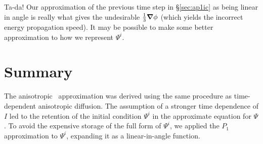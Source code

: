 Ta-da! Our approximation of the previous time step in \S\ref{sec:ap1ic} as
being linear in angle is really what gives the undesirable $\frac13\bm{\nabla}\phi$
(which yields the incorrect energy propagation speed). It may be possible to make some better approximation to how we represent $\Psi^i$.

\section{Summary}
The anisotropic \Pone\ approximation was derived using the same procedure as 
time-dependent anisotropic diffusion. The assumption of a stronger time
dependence of $I$ led to the retention of the initial condition $\Psi^i$ in the
approximate equation for $\Psi$. To avoid the expensive storage of the full form
of $\Psi^i$, we applied the $P_1$ approximation to $\Psi^i$, expanding it as a
linear-in-angle function.

